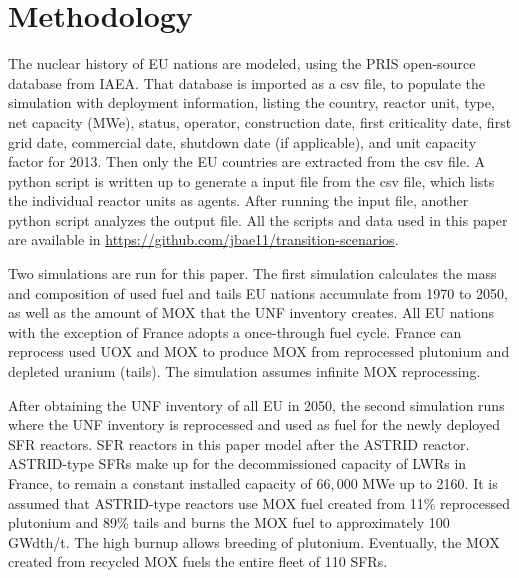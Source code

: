 \section{Methodology}
The nuclear history of EU nations are modeled, using the \gls{PRIS} open-source 
database from \gls{IAEA}. That database is imported as a csv file, to populate the simulation
with deployment information, listing the country, reactor unit, type, net capacity (MWe), status,
operator, construction date, first criticality date, first grid date, commercial date, shutdown
date (if applicable), and unit capacity factor for 2013. Then only the \gls{EU} countries are extracted
from the csv file. A python script is written up to generate a \Cyclus input file from the csv file,
which lists the individual reactor units as agents. After running the \Cyclus input file,
another python script analyzes the output file. All the scripts and data used
in this paper are available in \url{https://github.com/jbae11/transition-scenarios}.

Two \Cyclus simulations are run for this paper. 
The first simulation calculates
the mass and composition of used fuel and tails \gls{EU} nations accumulate from 1970 to 2050,
as well as the amount of \gls{MOX} that the \gls{UNF} inventory creates.
All EU nations with the exception of France adopts a once-through fuel cycle.
France can reprocess used \gls{UOX} and \gls{MOX} to
produce \gls{MOX} from reprocessed plutonium and depleted uranium (tails).
The simulation assumes infinite \gls{MOX} reprocessing. 

After obtaining the \gls{UNF} inventory of all \gls{EU} in 2050, the second
simulation runs where the \gls{UNF} inventory is reprocessed and used
as fuel for the newly deployed \gls{SFR} reactors.
\gls{SFR} reactors in this paper model after the ASTRID reactor.
ASTRID-type \glspl{SFR} make up for the decommissioned capacity
of \glspl{LWR} in France, to remain a constant installed capacity of $66,000$ MWe up to 2160.
It is assumed that ASTRID-type reactors use \gls{MOX} fuel created from 11\% reprocessed plutonium
and 89\% tails and burns the \gls{MOX} fuel to approximately 100 GWdth/t.
The high burnup allows breeding of plutonium.
Eventually, the  \gls{MOX} created from recycled \gls{MOX}
fuels the entire fleet of 110 \glspl{SFR}.


